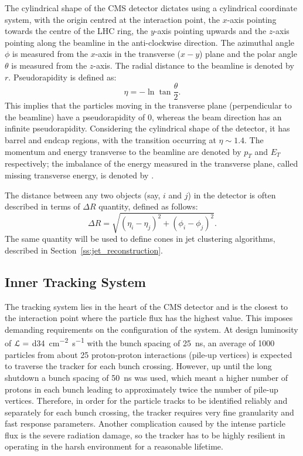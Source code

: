 The cylindrical shape of the CMS detector dictates using a cylindrical coordinate system, with the origin centred at the
interaction point, the $x$-axis pointing towards the centre of the LHC ring, the $y$-axis pointing upwards and the
$z$-axis pointing along the beamline in the anti-clockwise direction. The azimuthal angle $\phi$ is measured from the
$x$-axis in the transverse ($x-y$) plane and the polar angle $\theta$ is measured from the $z$-axis. The radial distance
to the beamline is denoted by $r$. Pseudorapidity is defined as:
\begin{equation}
  \eta = - \ln{\tan{\frac{\theta}{2}}}.
\end{equation}
This implies that the particles moving in the transverse plane (perpendicular to the beamline) have a pseudorapidity of
0, whereas the beam direction has an infinite pseudorapidity. Considering the cylindrical shape of the detector, it has
barrel and endcap regions, with the transition occurring at $\eta \sim 1.4$. The momentum and energy transverse to the
beamline are denoted by $p_T$ and $E_T$ respectively; the imbalance of the energy measured in the transverse plane,
called missing transverse energy, is denoted by \MET.

The distance between any two objects (say, $i$ and $j$) in the detector is often described in terms of $\Delta R$
quantity, defined as follows:
\begin{equation}
  \Delta R = \sqrt{(\eta_i-\eta_j)^2 + (\phi_i-\phi_j)^2}.
\end{equation}
The same quantity will be used to define cones in jet clustering algorithms, described in
Section~\ref{ss:jet_reconstruction}.

\subsection{Inner Tracking System}
\label{ss:tracker}
The tracking system lies in the heart of the CMS detector and is the closest to the interaction point where the particle
flux has the highest value. This imposes demanding requirements on the configuration of the system. At design luminosity
of $\mathcal{L} = $ \SI{d34}{\cm^{-2}~\s^{-1}} with the bunch spacing of \SI{25}{\ns}, an average of \num{1000} particles from
about \num{25} proton-proton interactions (pile-up vertices) is expected to traverse the tracker for each bunch
crossing. However, up until the long shutdown a bunch spacing of \SI{50}{\ns} was used, which meant a higher number of
protons in each bunch leading to approximately twice the number of pile-up vertices. Therefore, in order for the
particle tracks to be identified reliably and separately for each bunch crossing, the tracker requires very fine
granularity and fast response parameters. Another complication caused by the intense particle flux is the severe
radiation damage, so the tracker has to be highly resilient in operating in the harsh environment for a reasonable
lifetime.

